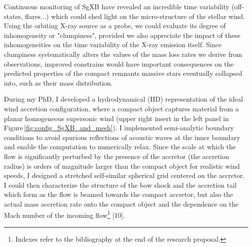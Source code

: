 \documentclass[letterpaper,12pt,onecolumn]{article}
\makeatletter
\newcommand{\sgx}{SgXB\xspace}
\newcommand*{\hmxb}{HMXB\@\xspace}
\makeatother
\begin{document}
\normalsize


Continuous monitoring of \sgx have revealed an incredible time variability (off-states, flares...) which could shed light on the micro-structure of the stellar wind. Using the orbiting X-ray source as a probe, we could evaluate its degree of inhomogeneity or "clumpiness", provided we also appreciate the impact of these inhomogeneities on the time variability of the X-ray emission itself. Since clumpiness systematically alters the values of the mass loss rates we derive from observations, improved constrains would have important consequences on the predicted properties of the compact remnants massive stars eventually collapsed into, such as their mass distribution.

During my PhD, I developed a hydrodynamical (HD) representation of the ideal wind accretion configuration, where a compact object captures material from a planar homogeneous supersonic wind (upper right insert in the left panel in Figure\,\ref{fig:config_SgXB_and_mesh}). I implemented semi-analytic boundary conditions to avoid spurious reflections of acoustic waves at the inner boundary and enable the computation to numerically relax. Since the scale at which the flow is significantly perturbed by the presence of the accretor (the accretion radius) is orders of magnitude larger than the compact object for realistic wind speeds, I designed a stretched self-similar spherical grid centered on the accretor. I could then characterize the structure of the bow shock and the accretion tail which form as the flow is beamed towards the compact accretor, but also the actual mass accretion rate onto the compact object and the dependence on the Mach number of the incoming flow\footnote{Indexes refer to the bibliography at the end of the research proposal.} [10]. 
\end{document}

